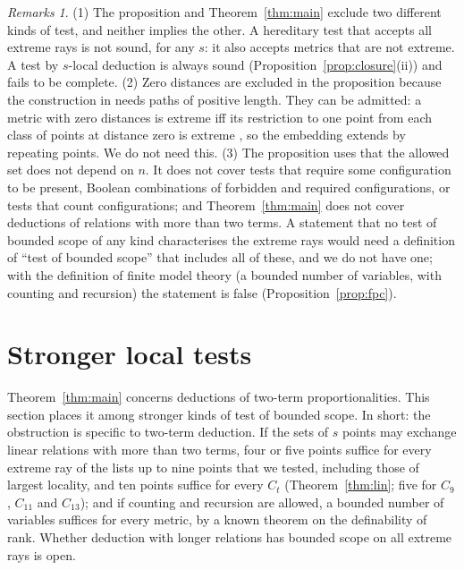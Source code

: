 \documentclass[11pt,a4paper]{article}
\theoremstyle{definition}
\theoremstyle{remark}
\newtheorem*{remarks}{Remarks}
\begin{document}
\begin{remarks}
(1) The proposition and Theorem~\ref{thm:main} exclude two different kinds of test, and neither implies the other.
A hereditary test that accepts all extreme rays is not sound, for any $s$: it also accepts metrics that are not
extreme. A test by $s$-local deduction is always sound (Proposition~\ref{prop:closure}(ii)) and fails to be
complete.
(2) Zero distances are excluded in the proposition because the construction in \cite{A80} needs paths of positive
length. They can be admitted: a metric with zero distances is extreme iff its restriction to one point from each
class of points at distance zero is extreme \cite[Thm 4.2]{A80}, so the embedding extends by repeating points. We
do not need this.
(3) The proposition uses that the allowed set does not depend on $n$. It does not cover tests that require some
configuration to be present, Boolean combinations of forbidden and required configurations, or tests that count
configurations; and Theorem~\ref{thm:main} does not cover deductions of relations with more than two terms. A
statement that no test of bounded scope of any kind characterises the extreme rays would need a definition of
``test of bounded scope'' that includes all of these, and we do not have one; with the definition of finite
model theory (a bounded number of variables, with counting and recursion) the statement is false
(Proposition~\ref{prop:fpc}).
\end{remarks}

\section{Stronger local tests}\label{sec:stronger}

Theorem~\ref{thm:main} concerns deductions of two-term proportionalities. This section places it among stronger
kinds of test of bounded scope. In short: the obstruction is specific to two-term deduction. If the sets of $s$
points may exchange linear relations with more than two terms, four or five points suffice for every extreme ray
of the lists up to nine points that we tested, including those of largest locality, and ten points suffice for every $C_t$
(Theorem~\ref{thm:lin}; five for $C_9$, $C_{11}$ and $C_{13}$); and if counting and recursion are allowed, a bounded number of variables suffices for every metric, by a
known theorem on the definability of rank. Whether deduction with longer relations has bounded scope on all extreme
rays is open.
\end{document}
